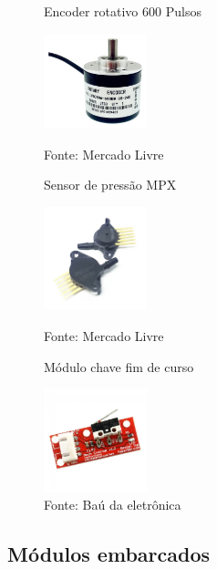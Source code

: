 \documentclass[../poliXuniversity_hospital_(USP)_report.tex]{subfiles}
\begin{document}
\begin{figure}[h]
\centering
    \begin{minipage}{0.3\textwidth}
        \centering
        \caption{Encoder rotativo 600 Pulsos}
        \centering %
        \includegraphics[width=3cm]{images/encoder.jpg}
        \caption*{Fonte: Mercado Livre}
        \label{figura: Encoder rotativo}
        
    \end{minipage}\hfill
    \begin{minipage}{0.3\textwidth}
    
        \centering
        \caption{Sensor de pressão MPX}
        \centering %
        \includegraphics[width=3cm]{images/mpx5700ap.jpg}
        \caption*{Fonte: Mercado Livre}
        \label{figura: Bomba de Vácuo}
        
    \end{minipage}\hfill
    \begin{minipage}{0.3\textwidth}
    
        \centering
        \caption{Módulo chave fim de curso}
        \centering %
        \includegraphics[width=3cm]{images/batente.jpg}
        \caption*{Fonte: Baú da eletrônica}
        \label{figura: Módulo chave fim de curso}
        
        
    \end{minipage}\hfill
\end{figure}

\subsection{Módulos embarcados}
\end{document}
